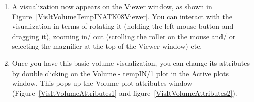 \begin{enumerate}
\begin{figure}[h]
  \centering
  \vspace{-10pt}
  \hspace{10pt}
  \hspace{10pt}
  \caption{}
  \vspace{-10pt}
  \label{}
\end{figure}





\item A visualization now appears on the Viewer window, as shown in
  Figure~\ref{VisItVolumeTempINATK08Viewer}. You can interact with the
  visualization in terms of rotating it (holding the left mouse button
  and dragging it), zooming in/ out (scrolling the roller on the mouse
  and/ or selecting the magnifier at the top of the Viewer window)
  etc.




\item Once you have this basic volume visualization, you can change
  its attributes by double clicking on the Volume - tempIN/1 plot in
  the Active plots window. This pops up the Volume plot attributes
  window (Figure~\ref{VisItVolumeAttributes1} and
  figure~\ref{VisItVolumeAttributes2}).


\end{enumerate}


